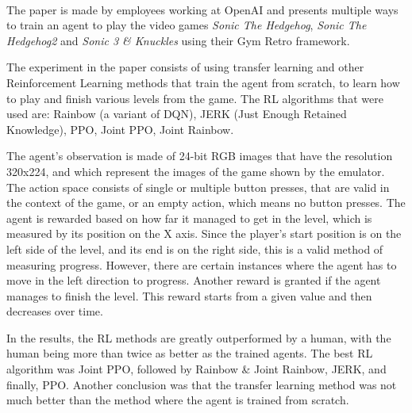 \paragraph{}
The paper \cite{nichol2018gottalearnfast} is made by employees working at OpenAI and presents multiple ways to train an agent to play the video games \emph{Sonic The Hedgehog}\texttrademark, \emph{Sonic The Hedgehog}\texttrademark\emph{2} and \emph{Sonic 3 \& Knuckles} using their Gym Retro framework. 

The experiment in the paper consists of using transfer learning and other Reinforcement Learning methods that train the agent from scratch, to learn how to play and finish various levels from the game. The RL algorithms that were used are: Rainbow (a variant of DQN), JERK (Just Enough Retained Knowledge), PPO, Joint PPO, Joint Rainbow.

The agent's observation is made of 24-bit RGB images that have the resolution 320x224, and which represent the images of the game shown by the emulator. The action space consists of single or multiple button presses, that are valid in the context of the game, or an empty action, which means no button presses. The agent is rewarded based on how far it managed to get in the level, which is measured by its position on the X axis. Since the player's start position is on the left side of the level, and its end is on the right side, this is a valid method of measuring progress. However, there are certain instances where the agent has to move in the left direction to progress. Another reward is granted if the agent manages to finish the level. This reward starts from a given value and then decreases over time.

In the results, the RL methods are greatly outperformed by a human, with the human being more than twice as better as the trained agents. The best RL algorithm was Joint PPO, followed by Rainbow \& Joint Rainbow, JERK, and finally, PPO. Another conclusion was that the transfer learning method was not much better than the method where the agent is trained from scratch.




